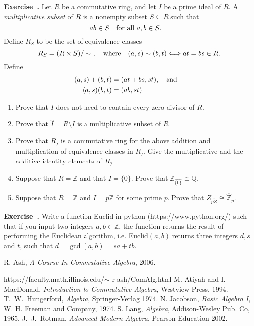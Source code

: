 \documentclass[12pt]{article}
\newcommand{\qbox}[1]{\quad\hbox{#1}\quad}
\theoremstyle{definition}
\newcounter{ex}\renewcommand\theex{\arabic{ex}}
\newenvironment{exo}{\begin{flushleft}%
\textbf{\refstepcounter{ex}Exercise~\theex.}}{\end{flushleft}}
\newcommand{\Z}{\ensuremath{\mathbb{Z}}}
\newcommand{\Q}{\ensuremath{\mathbb{Q}}}
\def\Zp{\widehat{\Z}_p}
\begin{document}
\begin{exo}
Let $R$ be a commutative ring, and let $I$ be a prime ideal of $R$.
A {\em multiplicative subset} of $R$ is a
nonempty subset $S\subseteq R$ such that
$$ab\in S\qbox{for all $a,b\in S$.}$$
Define $R_S$ to be the set of equivalence classes
$$R_S=(R\times S)/\sim~,\qbox{where}(a,s)\sim(b,t)\Longleftrightarrow
at=bs\in R.$$
Define
\begin{align*}
(a,s)+(b,t)&=(at+bs,st),\qbox{and}\\
(a,s)(b,t)&=(ab,st)
\end{align*}
\begin{enumerate}
\item Prove that $I$ does not need to contain every zero divisor of $R$.
\item Prove that $\hat I=R\setminus I$ is a multiplicative
subset of $R$.
\item Prove that $R_{\hat I}$ is a commutative ring for the above
addition and multiplication of equivalence classes in $R_{\hat I}$.
Give the multiplicative and the additive identity elements of
$R_{\hat I}$.
\item Suppose that $R=\Z$ and that $I=\{0\}$. Prove that
$\Z_{\widehat{\{0\}}}\cong\Q$.
\item Suppose that $R=\Z$ and $I=p\Z$ for some prime $p$. Prove that
$Z_{\widehat{pZ}}\cong\Zp$.
\end{enumerate}
\end{exo}




\begin{exo}
Write a function {\sc Euclid} in python (https://www.python.org/)
such that if you input two integers $a,b\in\Z$, the function returns
the result of performing the Euclidean algorithm, i.e.
{\sc Euclid}$(a,b)$ returns three integers $d,s$ and $t$, such that
$d=\gcd(a,b)=sa+tb$.

\end{exo}



\vfill
\newpage
\begin{thebibliography}{WWWW}
 R. Ash, {\em A Course In Commutative Algebra}, 2006.\hfill\par
https://faculty.math.illinois.edu/$\sim$ r-ash/ComAlg.html
 M. Atiyah and I. MacDonald, {\em Introduction
to Commutative Algebra}, Westview Press, 1994.
 T.~W.~Hungerford, {\em Algebra}, Springer-Verlag 1974.
 N. Jacobson, {\em Basic Algebra I}, W. H. Freeman and
  Company, 1974. 
 S. Lang, {\em Algebra},  Addison-Wesley Pub. Co, 1965.
 J.~J.~Rotman, {\em Advanced Modern Algebra}, Pearson Education
  2002.
\end{thebibliography}

\printindex
\end{document}
